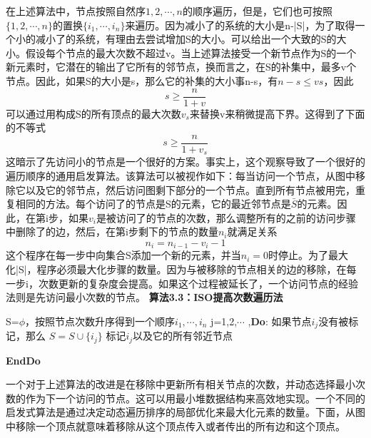 \documentclass{article}
\begin{document}
在上述算法中，节点按照自然序$1,2,\cdots,n$的顺序遍历，但是，它们也可按照$\{1,2,\cdots,n\}$的置换$\{i_1,\cdots,i_n\}$来遍历。因为减小了的系统的大小是n-|S|，为了取得一个小的减小了的系统，有理由去尝试增加S的大小。可以给出一个大致的S的大小。假设每个节点的最大次数不超过v。当上述算法接受一个新节点作为S的一个新元素时，它潜在的输出了它所有的邻节点，换而言之，在S的补集中，最多v个节点。因此，如果S的大小是s，那么它的补集的大小事n-s，有$n-s\leq vs$，因此
$$s\geq \frac{n}{1+v}$$
可以通过用构成S的所有顶点的最大次数$v_s$来替换v来稍微提高下界。这得到了下面的不等式
$$s\geq \frac{n}{1+v_s}$$
这暗示了先访问小的节点是一个很好的方案。事实上，这个观察导致了一个很好的遍历顺序的通用启发算法。该算法可以被视作如下：每当访问一个节点，从图中移除它以及它的邻节点，然后访问图剩下部分的一个节点。直到所有节点被用完，重复相同的方法。每个访问了的节点是S的元素，它的最近邻节点是$\bar{S}$的元素。因此，在第i步，如果$v_i$是被访问了的节点的次数，那么调整所有的之前的访问步骤中删除了的边，然后，在第i步剩下的节点的数量$n_i$就满足关系
$$n_i=n_{i-1}-v_i-1$$
这个程序在每一步中向集合S添加一个新的元素，并当$n_i=0$时停止。为了最大化|S|，程序必须最大化步骤的数量。因为与被移除的节点相关的边的移除，在每一步i，次数更新的复杂度会提高。如果这个过程被延长了，一个访问节点的经验法则是先访问最小次数的节点。
\newline
\textbf{算法3.3：ISO提高次数遍历法}
\begin{codebox}

\li S=$\phi$，按照节点次数升序得到一个顺序$i_1,\cdots ,i_n$
\li  \For j=1,2,$\cdots$  ,\textbf{Do}: 
\li       	如果节点$i_j$没有被标记，那么
\li        	$S=S\cup \{i_ j\}$
\li            	标记$i_ j$以及它的所有邻近节点

        \End
        \li \textbf{EndDo} 
\end{codebox}
一个对于上述算法的改进是在移除中更新所有相关节点的次数，并动态选择最小次数的作为下一个访问的节点。这可以用最小堆数据结构来高效地实现。一个不同的启发式算法是通过决定动态遍历排序的局部优化来最大化元素的数量。下面，从图中移除一个顶点就意味着移除从这个顶点传入或者传出的所有边和这个顶点。
\end{document}
